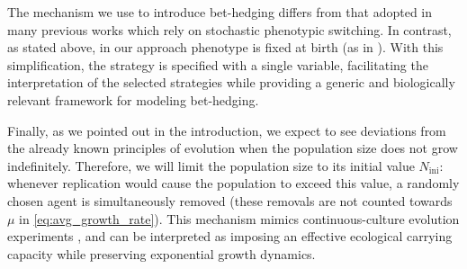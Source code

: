 \documentclass[aps,pre,reprint,10pt,superscriptaddress]{revtex4-2}
\begin{document}
The mechanism we use to introduce bet-hedging differs from that adopted in many previous works \cite{kussellPhenotypicDiversityPopulation2005,patraEmergencePhenotypeSwitching2015,bressloffStochasticSwitchingBiology2017,huftonPhenotypicSwitchingPopulations2018,villamartinBethedgingStrategiesExpanding2019,dinisParetooptimalTradeoffPhenotypic2022} which rely on stochastic phenotypic switching. In contrast, as stated above, in our approach phenotype is fixed at birth (as in \cite{xueBetHedgingDemographic2017}). With this simplification, the strategy is specified with a single variable, facilitating the interpretation of the selected strategies while providing a generic and biologically relevant framework for modeling bet-hedging.

Finally, as we pointed out in the introduction, we expect to see deviations from the already known principles of evolution when the population size does not grow indefinitely. Therefore, we will limit the population size to its initial value $N_\text{ini}$: whenever replication would cause the population to exceed this value, a randomly chosen agent is simultaneously removed (these removals are not counted towards $\mu$ in \cref{eq:avg_growth_rate}). This mechanism mimics continuous-culture evolution experiments \cite{collectiveEconomicPrinciplesCell}, and can be interpreted as imposing an effective ecological carrying capacity while preserving exponential growth dynamics.
\end{document}
